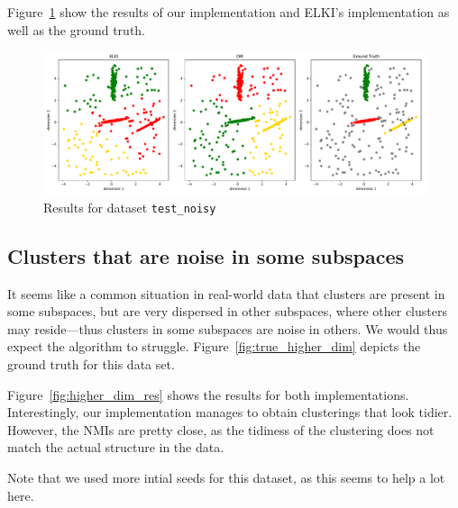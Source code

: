 \documentclass[english]{scrartcl}
\begin{document}
Figure~\ref{fig:noisy-cmp} show the results
of our implementation and ELKI's implementation as well as the ground truth.

\begin{figure}[tb]
    \centering
    \includegraphics[width=\textwidth]{img/test_noisy_cmp}
    \caption{Results for dataset \texttt{test\_noisy}}
    \label{fig:noisy-cmp}
\end{figure}

\subsection{Clusters that are noise in some subspaces}

It seems like a common situation in real-world data that clusters are present
in some subspaces, but are very dispersed in other subspaces, where other
clusters may reside---thus clusters in some subspaces are noise in others. We
would thus expect the algorithm to struggle. Figure~\ref{fig:true_higher_dim} depicts
the ground truth for this data set.

Figure~\ref{fig:higher_dim_res} shows the results for both implementations.
Interestingly, our implementation manages to obtain clusterings that
look tidier. However, the NMIs are pretty close, as the tidiness of
the clustering does not match the actual structure in the data.

Note that we used more intial seeds for this dataset, as this seems to
help a lot here.
\end{document}
